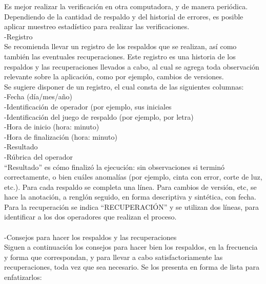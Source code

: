 \documentclass[12pt,letterpaper]{article}
\begin{document}
Es mejor realizar la verificación en otra computadora, y de manera periódica. Dependiendo de la cantidad de respaldo y del historial de errores, es posible aplicar muestreo estadístico para realizar las verificaciones. \\

-Registro \\
Se recomienda llevar un registro de los respaldos que se realizan, así como también las eventuales recuperaciones. Este registro es una historia de los respaldos y las recuperaciones llevados a cabo, al cual se agrega toda observación relevante sobre la aplicación, como por ejemplo, cambios de versiones. \\

Se sugiere disponer de un registro, el cual consta de las siguientes columnas: \\

-Fecha (día/mes/año) \\
-Identificación de operador (por ejemplo, sus iniciales \\
-Identificación del juego de respaldo (por ejemplo, por letra)  \\
-Hora de inicio (hora: minuto) \\
-Hora de finalización (hora: minuto) \\
-Resultado \\
-Rúbrica del operador \\

“Resultado” es cómo finalizó la ejecución: sin observaciones si terminó correctamente, o bien cuáles anomalías (por ejemplo, cinta con error, corte de luz, etc.). Para cada respaldo se completa una línea. Para cambios de versión, etc, se hace la anotación, a renglón seguido, en forma descriptiva y sintética, con fecha. Para la recuperación se indica “RECUPERACIÓN” y se utilizan dos líneas, para identificar a los dos operadores que realizan el proceso.  \\\\

-Consejos para hacer los respaldos y las recuperaciones \\

Siguen a continuación los consejos para hacer bien los respaldos, en la frecuencia y forma que correspondan, y para llevar a cabo satisfactoriamente las recuperaciones, toda vez que sea necesario. Se los presenta en forma de lista para enfatizarlos: \\\\
\end{document}
